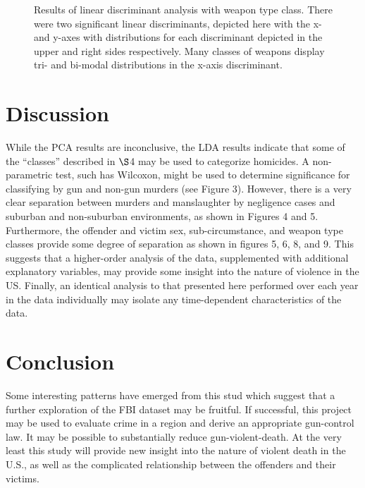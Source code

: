 \documentclass{evanarticle}
\begin{document}
\begin{figure}[H]
  \caption{Results of linear discriminant analysis with weapon type class.  There were two significant linear discriminants, depicted here with the x- and y-axes with distributions for each discriminant depicted in the upper and right sides respectively.  Many classes of weapons display tri- and bi-modal distributions in the x-axis discriminant.}

\end{figure}

\newpage


\section{Discussion}

While the PCA results are inconclusive, the LDA results indicate that some of the ``classes'' described in $\S$4 may be used to categorize homicides.  A non-parametric test, such has Wilcoxon, might be used to determine significance for classifying by gun and non-gun murders (see Figure 3).  However, there is a very clear separation between murders and manslaughter by negligence cases and suburban and non-suburban environments, as shown in Figures 4 and 5.  Furthermore, the offender and victim sex, sub-circumstance, and weapon type classes provide some degree of separation as shown in figures 5, 6, 8, and 9.  This suggests that a higher-order analysis of the data, supplemented with additional explanatory variables, may provide some insight into the nature of violence in the US.  Finally, an identical analysis to that presented here performed over each year in the data individually may isolate any time-dependent characteristics of the data.

\section{Conclusion}

Some interesting patterns have emerged from this stud which suggest that a further exploration of the FBI dataset may be fruitful.  If successful, this project may be used to evaluate crime in a region and derive an appropriate gun-control law.  It may be possible to substantially reduce gun-violent-death.  At the very least this study will provide new insight into the nature of violent death in the U.S., as well as the complicated relationship between the offenders and their victims.

\printbibliography

\end{document}
